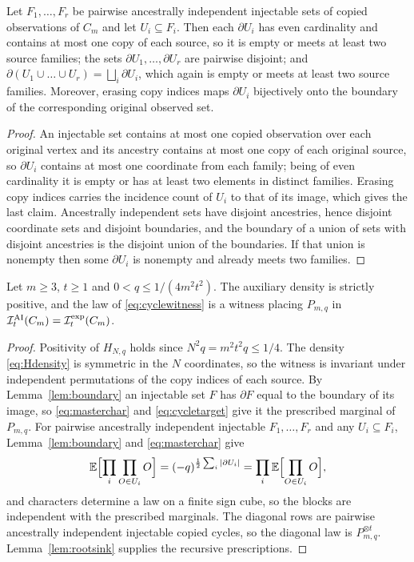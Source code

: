 \begin{lemma}\label{lem:boundary}
Let $F_1,\dots,F_r$ be pairwise ancestrally independent injectable sets of copied observations of $C_m$ and let $U_i\subseteq F_i$. Then each $\partial U_i$ has even cardinality and contains at most one copy of each source, so it is empty or meets at least two source families; the sets $\partial U_1,\dots,\partial U_r$ are pairwise disjoint; and $\partial(U_1\cup\dots\cup U_r)=\bigsqcup_i\partial U_i$, which again is empty or meets at least two source families. Moreover, erasing copy indices maps $\partial U_i$ bijectively onto the boundary of the corresponding original observed set.
\end{lemma}

\begin{proof}
An injectable set contains at most one copied observation over each original vertex and its ancestry contains at most one copy of each original source, so $\partial U_i$ contains at most one coordinate from each family; being of even cardinality it is empty or has at least two elements in distinct families. Erasing copy indices carries the incidence count of $U_i$ to that of its image, which gives the last claim. Ancestrally independent sets have disjoint ancestries, hence disjoint coordinate sets and disjoint boundaries, and the boundary of a union of sets with disjoint ancestries is the disjoint union of the boundaries. If that union is nonempty then some $\partial U_i$ is nonempty and already meets two families.
\end{proof}

\begin{lemma}\label{lem:cyclewitness}
Let $m\ge3$, $t\ge1$ and $0<q\le1/(4m^2t^2)$. The auxiliary density is strictly positive, and the law of \eqref{eq:cyclewitness} is a witness placing $P_{m,q}$ in $\mathcal I^{\mathrm{AI}}_t(C_m)=\mathcal I^{\mathrm{exp}}_t(C_m)$.
\end{lemma}

\begin{proof}
Positivity of $H_{N,q}$ holds since $N^2q=m^2t^2q\le1/4$. The density \eqref{eq:Hdensity} is symmetric in the $N$ coordinates, so the witness is invariant under independent permutations of the copy indices of each source. By Lemma~\ref{lem:boundary} an injectable set $F$ has $\partial F$ equal to the boundary of its image, so \eqref{eq:masterchar} and \eqref{eq:cycletarget} give it the prescribed marginal of $P_{m,q}$. For pairwise ancestrally independent injectable $F_1,\dots,F_r$ and any $U_i\subseteq F_i$, Lemma~\ref{lem:boundary} and \eqref{eq:masterchar} give
\[
\mathbb E\Bigl[\prod_i\prod_{O\in U_i}O\Bigr]=(-q)^{\frac12\sum_i|\partial U_i|}=\prod_i\mathbb E\Bigl[\prod_{O\in U_i}O\Bigr],
\]
and characters determine a law on a finite sign cube, so the blocks are independent with the prescribed marginals. The diagonal rows are pairwise ancestrally independent injectable copied cycles, so the diagonal law is $P_{m,q}^{\otimes t}$. Lemma~\ref{lem:rootsink} supplies the recursive prescriptions.
\end{proof}


